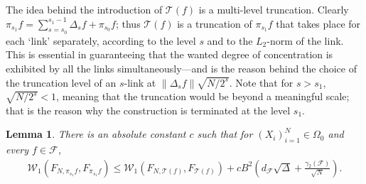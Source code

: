 \documentclass[11pt]{amsart}
\newcommand{\W}{\mathcal{W}}
\newtheorem{lemma}[theorem]{Lemma}
\theoremstyle{definition}
\numberwithin{equation}{section}
\begin{document}
The idea behind the introduction of $\mathcal{T}(f)$ is  a multi-level truncation.
Clearly $ \pi_{s_{1}} f =  \sum_{s=s_{0}}^{s_{1}-1} \Delta_{s}f +\pi_{s_0}f$; thus $\mathcal{T}(f)$ is a truncation of $\pi_{s_{1}}f$ that takes place for each `link' separately, according to the level $s$ and to the $L_{2}$-norm of the link. 
This is essential in guaranteeing that the wanted degree of concentration is exhibited by all the links simultaneously---and is the reason behind the choice of the truncation level of an $s$-link at $\|\Delta_{s} f\|\sqrt{N/2^{s}}$.
Note that for $s>s_1$, $\sqrt{N/2^s}<1$, meaning that the truncation would be beyond a meaningful scale; that is the reason why the construction is terminated at the level $s_1$.

 

\begin{lemma}
\label{lem:reduction.to.truncation}
There is an absolute constant $c$ such that for $(X_{i})_{i=1}^{N}\in\Omega_{0}$ and  every $f\in\mathcal{F}$,
\begin{align*}
 \W_{1}(F_{N,\pi_{s_{1}}f}, F_{\pi_{s_{1}}f}) 
\leq \W_{1}(F_{N,\mathcal{T}(f)}, F_{\mathcal{T}(f)} ) + cB^{2}\left(  d_{\mathcal{F}} \sqrt\Delta + \frac{\gamma_{2}(\mathcal{F})}{\sqrt N}\right).
\end{align*} 
\end{lemma}
\end{document}
